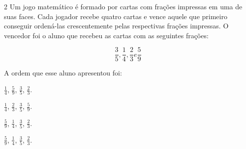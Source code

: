 

\num{2}  Um jogo matemático é formado por cartas com frações impressas em uma
de suas faces. Cada jogador recebe quatro cartas e vence aquele que
primeiro conseguir ordená-las crescentemente pelas respectivas frações
impressas. O vencedor foi o aluno que recebeu as cartas com as seguintes frações:

$$\frac{3}{5}, \frac{1}{4}, \frac{2}{3} e \frac{5}{9}$$

A ordem que esse aluno apresentou foi:

\begin{multicols}{2}
\begin{escolha}
\item $\frac{1}{4}$, $\frac{5}{9}$, $\frac{3}{5}$, $\frac{2}{3}$.
\item $\frac{1}{4}$, $\frac{2}{3}$, $\frac{3}{5}$, $\frac{5}{9}$.
\item $\frac{5}{9}$, $\frac{1}{4}$, $\frac{3}{5}$, $\frac{2}{3}$.
\item $\frac{5}{9}$, $\frac{1}{4}$, $\frac{3}{5}$, $\frac{2}{3}$.
\end{escolha}
\end{multicols}
\enlargethispage{2\baselineskip}


